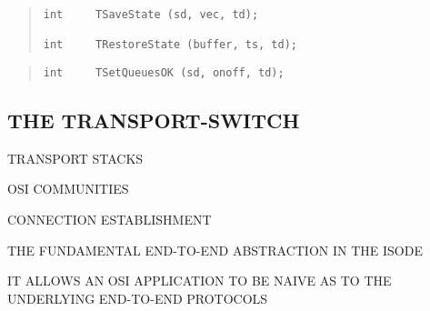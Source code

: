 \begin{bwslide}

\begin{quote}\small\begin{verbatim}
int     TSaveState (sd, vec, td);

int     TRestoreState (buffer, ts, td);
\end{verbatim}\end{quote}
\end{bwslide}


\begin{bwslide}

\begin{quote}\small\begin{verbatim}
int     TSetQueuesOK (sd, onoff, td);
\end{verbatim}\end{quote}
\end{bwslide}


\begin{bwslide}
\part	{THE TRANSPORT-SWITCH}\bf

\begin{nrtc}
\item	TRANSPORT STACKS

\item	OSI COMMUNITIES

\item	CONNECTION ESTABLISHMENT
\end{nrtc}
\end{bwslide}


\begin{bwslide}

\begin{nrtc}
\item	THE FUNDAMENTAL END-TO-END ABSTRACTION IN THE ISODE

\item	IT ALLOWS AN OSI APPLICATION TO BE NAIVE AS TO THE UNDERLYING
	END-TO-END PROTOCOLS
\end{nrtc}
\end{bwslide}


